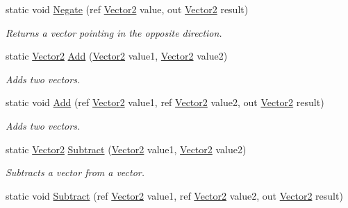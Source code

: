 \begin{DoxyCompactItemize}
static void \hyperlink{struct_microsoft_1_1_xna_1_1_framework_1_1_vector2_ab2ef0e041442ae6ed99252f0ed52a889}{Negate} (ref \hyperlink{struct_microsoft_1_1_xna_1_1_framework_1_1_vector2}{Vector2} value, out \hyperlink{struct_microsoft_1_1_xna_1_1_framework_1_1_vector2}{Vector2} result)
\begin{DoxyCompactList}\small\item\em Returns a vector pointing in the opposite direction.\end{DoxyCompactList}\item 
static \hyperlink{struct_microsoft_1_1_xna_1_1_framework_1_1_vector2}{Vector2} \hyperlink{struct_microsoft_1_1_xna_1_1_framework_1_1_vector2_a7e4e291cc72e89061ec150ae8e83f70d}{Add} (\hyperlink{struct_microsoft_1_1_xna_1_1_framework_1_1_vector2}{Vector2} value1, \hyperlink{struct_microsoft_1_1_xna_1_1_framework_1_1_vector2}{Vector2} value2)
\begin{DoxyCompactList}\small\item\em Adds two vectors.\end{DoxyCompactList}\item 
static void \hyperlink{struct_microsoft_1_1_xna_1_1_framework_1_1_vector2_a4ecb622533223cbcf951e438e416d1de}{Add} (ref \hyperlink{struct_microsoft_1_1_xna_1_1_framework_1_1_vector2}{Vector2} value1, ref \hyperlink{struct_microsoft_1_1_xna_1_1_framework_1_1_vector2}{Vector2} value2, out \hyperlink{struct_microsoft_1_1_xna_1_1_framework_1_1_vector2}{Vector2} result)
\begin{DoxyCompactList}\small\item\em Adds two vectors.\end{DoxyCompactList}\item 
static \hyperlink{struct_microsoft_1_1_xna_1_1_framework_1_1_vector2}{Vector2} \hyperlink{struct_microsoft_1_1_xna_1_1_framework_1_1_vector2_a48469e4ad1613743bf9c223d9f4644bf}{Subtract} (\hyperlink{struct_microsoft_1_1_xna_1_1_framework_1_1_vector2}{Vector2} value1, \hyperlink{struct_microsoft_1_1_xna_1_1_framework_1_1_vector2}{Vector2} value2)
\begin{DoxyCompactList}\small\item\em Subtracts a vector from a vector.\end{DoxyCompactList}\item 
static void \hyperlink{struct_microsoft_1_1_xna_1_1_framework_1_1_vector2_a5dbd7be74531904fbb666a01e4734f2d}{Subtract} (ref \hyperlink{struct_microsoft_1_1_xna_1_1_framework_1_1_vector2}{Vector2} value1, ref \hyperlink{struct_microsoft_1_1_xna_1_1_framework_1_1_vector2}{Vector2} value2, out \hyperlink{struct_microsoft_1_1_xna_1_1_framework_1_1_vector2}{Vector2} result)

\end{DoxyCompactItemize}
